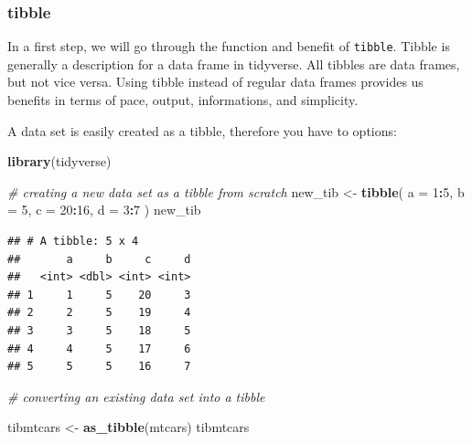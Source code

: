 \documentclass[]{report}
\newenvironment{Shaded}{\begin{snugshade}}{\end{snugshade}}
\newcommand{\KeywordTok}[1]{\textcolor[rgb]{0.13,0.29,0.53}{\textbf{#1}}}
\newcommand{\DataTypeTok}[1]{\textcolor[rgb]{0.13,0.29,0.53}{#1}}
\newcommand{\DecValTok}[1]{\textcolor[rgb]{0.00,0.00,0.81}{#1}}
\newcommand{\StringTok}[1]{\textcolor[rgb]{0.31,0.60,0.02}{#1}}
\newcommand{\CommentTok}[1]{\textcolor[rgb]{0.56,0.35,0.01}{\textit{#1}}}
\newcommand{\OperatorTok}[1]{\textcolor[rgb]{0.81,0.36,0.00}{\textbf{#1}}}
\newcommand{\NormalTok}[1]{#1}
\begin{document}
\subsubsection{tibble}\label{tibble}

In a first step, we will go through the function and benefit of
\texttt{tibble}. Tibble is generally a description for a data frame in
tidyverse. All tibbles are data frames, but not vice versa. Using tibble
instead of regular data frames provides us benefits in terms of pace,
output, informations, and simplicity.

A data set is easily created as a tibble, therefore you have to options:

\begin{Shaded}
\begin{Highlighting}[]
\KeywordTok{library}\NormalTok{(tidyverse)}

\CommentTok{# creating a new data set as a tibble from scratch}
\NormalTok{new_tib <-}\StringTok{ }\KeywordTok{tibble}\NormalTok{(}
  \DataTypeTok{a =} \DecValTok{1}\OperatorTok{:}\DecValTok{5}\NormalTok{, }
  \DataTypeTok{b =} \DecValTok{5}\NormalTok{, }
  \DataTypeTok{c =} \DecValTok{20}\OperatorTok{:}\DecValTok{16}\NormalTok{,}
  \DataTypeTok{d =} \DecValTok{3}\OperatorTok{:}\DecValTok{7}
\NormalTok{)}
\NormalTok{new_tib}
\end{Highlighting}
\end{Shaded}

\begin{verbatim}
## # A tibble: 5 x 4
##       a     b     c     d
##   <int> <dbl> <int> <int>
## 1     1     5    20     3
## 2     2     5    19     4
## 3     3     5    18     5
## 4     4     5    17     6
## 5     5     5    16     7
\end{verbatim}

\begin{Shaded}
\begin{Highlighting}[]
\CommentTok{# converting an existing data set into a tibble}


\NormalTok{tibmtcars <-}\StringTok{ }\KeywordTok{as_tibble}\NormalTok{(mtcars)}
\NormalTok{tibmtcars}
\end{Highlighting}
\end{Shaded}
\end{document}

